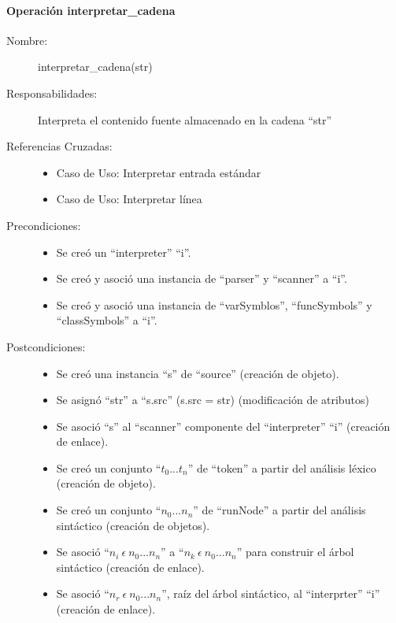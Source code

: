 \paragraph{Operación interpretar\_cadena}
\FloatBarrier
\begin{framed}
	\begin{description}
		\item [Nombre:] interpretar\_cadena(str)
		\item [Responsabilidades:] Interpreta el contenido fuente almacenado en la cadena ``str''
		\item [Referencias Cruzadas: ] \hfill
      \begin {itemize}
      \item Caso de Uso: Interpretar entrada estándar 
      \item Caso de Uso: Interpretar línea
      \end{itemize}
      \item [Precondiciones:] \hfill
      \begin {itemize}
      \item Se creó un ``interpreter'' ``i''.
      \item Se creó y asoció una instancia de ``parser'' y ``scanner'' a ``i''.
      \item Se creó y asoció una instancia de ``varSymblos'', ``funcSymbols'' y ``classSymbols'' a ``i''.
      \end{itemize}
      \item [Postcondiciones:] \hfill
      \begin {itemize}
         \item Se creó una instancia ``s'' de ``source'' (creación de objeto).
         \item Se asignó ``str'' a ``s.src'' (s.src = str) (modificación de atributos)
         \item Se asoció ``s'' al ``scanner'' componente del ``interpreter'' ``i'' (creación de enlace). 
         \item Se creó un conjunto ``$t_0...t_n$'' de ``token'' a partir del análisis léxico (creación de objeto).
         \item Se creó un conjunto ``$n_0...n_n$'' de ``runNode'' a partir del análisis sintáctico (creación de objetos).
         \item Se asoció ``$n_i\ \epsilon\ n_0...n_n$'' a ``$n_k\ \epsilon\ n_0...n_n$'' para construir el árbol sintáctico (creación de enlace).
         \item Se asoció  ``$n_r\ \epsilon\ n_0...n_n$'', raíz del árbol sintáctico, al ``interprter'' ``i'' (creación de enlace).

\end{itemize}
\end{description}
\end{framed}

